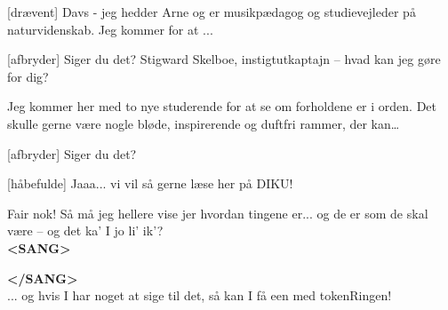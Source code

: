 \documentclass[a4paper,11pt]{article}
\begin{document}
  \begin{sketch}
    

[drævent] Davs - jeg hedder Arne og er musikpædagog og
studievejleder på naturvidenskab. Jeg kommer for at ...

[afbryder] Siger du det?  Stigward Skelboe,
instigtutkaptajn -- hvad kan jeg gøre for dig?

 Jeg kommer her med to nye studerende for at se om forholdene
er i orden. Det skulle gerne være nogle bløde, inspirerende og duftfri
rammer, der kan\ldots

[afbryder] Siger du det? 

 [håbefulde] Jaaa... vi vil så gerne læse her på DIKU!

 Fair nok! Så må jeg hellere vise jer hvordan tingene
er... og de er som de skal være -- og det ka' I jo li' ik'?\\

\large{\textbf{<SANG>}}


\large{\textbf{</SANG>}}\\

 ... og hvis I har noget at sige til det, så kan I få een med
tokenRingen! 








\end{sketch}
\end{document}
